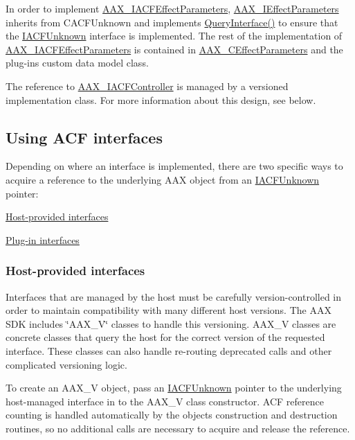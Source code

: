 In order to implement \hyperlink{a00061}{A\+A\+X\+\_\+\+I\+A\+C\+F\+Effect\+Parameters}, \hyperlink{a00099}{A\+A\+X\+\_\+\+I\+Effect\+Parameters} inherits from {\ttfamily C\+A\+C\+F\+Unknown} and implements \hyperlink{a00146_a8b7f0ae9c78d007ca76aa462ebe53135}{Query\+Interface()} to ensure that the \hyperlink{a00146}{I\+A\+C\+F\+Unknown} interface is implemented. The rest of the implementation of \hyperlink{a00061}{A\+A\+X\+\_\+\+I\+A\+C\+F\+Effect\+Parameters} is contained in \hyperlink{a00018}{A\+A\+X\+\_\+\+C\+Effect\+Parameters} and the plug-\/in\textquotesingle{}s custom data model class.

The reference to \hyperlink{a00053}{A\+A\+X\+\_\+\+I\+A\+C\+F\+Controller} is managed by a versioned implementation class. For more information about this design, see below.\hypertarget{a00357_using_acf}{}\subsection{Using A\+C\+F interfaces}\label{a00357_using_acf}
Depending on where an interface is implemented, there are two specific ways to acquire a reference to the underlying A\+A\+X object from an \hyperlink{a00146}{I\+A\+C\+F\+Unknown} pointer\+:

\begin{DoxyItemize}
\item \hyperlink{a00357_using_acf_host_provided_interfaces}{Host-\/provided interfaces} \item \hyperlink{a00357_using_acf_plug_in_interfaces}{Plug-\/in interfaces}\end{DoxyItemize}
\hypertarget{a00357_using_acf_host_provided_interfaces}{}\subsubsection{Host-\/provided interfaces}\label{a00357_using_acf_host_provided_interfaces}
Interfaces that are managed by the host must be carefully version-\/controlled in order to maintain compatibility with many different host versions. The A\+A\+X S\+D\+K includes \char`\"{}\+A\+A\+X\+\_\+\+V\char`\"{} classes to handle this versioning. A\+A\+X\+\_\+\+V classes are concrete classes that query the host for the correct version of the requested interface. These classes can also handle re-\/routing deprecated calls and other complicated versioning logic.

To create an A\+A\+X\+\_\+\+V object, pass an \hyperlink{a00146}{I\+A\+C\+F\+Unknown} pointer to the underlying host-\/managed interface in to the A\+A\+X\+\_\+\+V class\textquotesingle{} constructor. A\+C\+F reference counting is handled automatically by the object\textquotesingle{}s construction and destruction routines, so no additional calls are necessary to acquire and release the reference.


